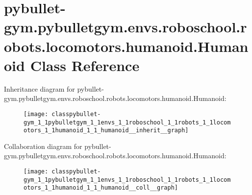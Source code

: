 \hypertarget{classpybullet-gym_1_1pybulletgym_1_1envs_1_1roboschool_1_1robots_1_1locomotors_1_1humanoid_1_1_humanoid}{}\section{pybullet-\/gym.pybulletgym.\+envs.\+roboschool.\+robots.\+locomotors.\+humanoid.\+Humanoid Class Reference}
\label{classpybullet-gym_1_1pybulletgym_1_1envs_1_1roboschool_1_1robots_1_1locomotors_1_1humanoid_1_1_humanoid}


Inheritance diagram for pybullet-\/gym.pybulletgym.\+envs.\+roboschool.\+robots.\+locomotors.\+humanoid.\+Humanoid\+:
\nopagebreak
\begin{figure}[H]
\begin{center}
\leavevmode
\texttt{[image: classpybullet-gym\_1\_1pybulletgym\_1\_1envs\_1\_1roboschool\_1\_1robots\_1\_1locomotors\_1\_1humanoid\_1\_1\_humanoid\_\_inherit\_\_graph]}
\end{center}
\end{figure}


Collaboration diagram for pybullet-\/gym.pybulletgym.\+envs.\+roboschool.\+robots.\+locomotors.\+humanoid.\+Humanoid\+:
\nopagebreak
\begin{figure}[H]
\begin{center}
\leavevmode
\texttt{[image: classpybullet-gym\_1\_1pybulletgym\_1\_1envs\_1\_1roboschool\_1\_1robots\_1\_1locomotors\_1\_1humanoid\_1\_1\_humanoid\_\_coll\_\_graph]}
\end{center}
\end{figure}
